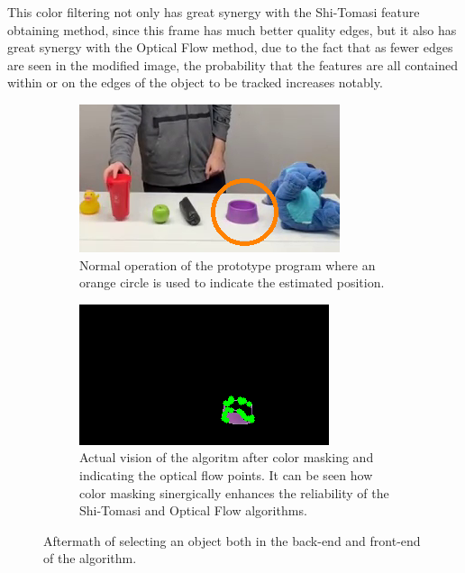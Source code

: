 This color filtering not only has great synergy with the Shi-Tomasi feature obtaining method, since this frame has much better quality edges, but it also has great synergy with the Optical Flow method, due to the fact that as fewer edges are seen in the modified image, the probability that the features are all contained within or on the edges of the object to be tracked increases notably.

\begin{figure}[h]
\centering
	\begin{subfigure}{.4\textwidth}
		\centering
		\includegraphics[width=\textwidth]{Imagenes/Optical1.png}
		\caption{Normal operation of the prototype program where an orange circle is used to indicate the estimated position.}
		\label{fig:optical1}
	\end{subfigure}
	\begin{subfigure}{.4\textwidth}
		\centering
		\includegraphics[width=\textwidth]{Imagenes/Optical2.png}
		\caption{Actual vision of the algoritm after color masking and indicating the optical flow points. It can be seen how color masking sinergically enhances the reliability of the Shi-Tomasi and Optical Flow algorithms.}
		\label{fig:optical2}
	\end{subfigure}
	\caption{Aftermath of selecting an object both in the back-end and front-end of the algorithm.}
	\label{fig:optical12}
\end{figure}

